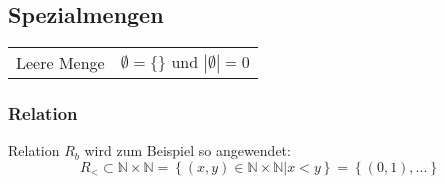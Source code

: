 \subsection{Spezialmengen}
	\begin{tabular}{l l}
		Leere Menge & $\emptyset = \{\}$ und $|\emptyset| = 0$
	\end{tabular}

\subsubsection{Relation}
	Relation $R_b$ wird zum Beispiel so angewendet:
	\[
		R_< \subset \mathbb{N} \times \mathbb{N} =
			\left\{ (x,y) \in \mathbb{N} \times \mathbb{N} | x<y \right\} =
			\left\{ (0,1), ... \right\}
	\]


